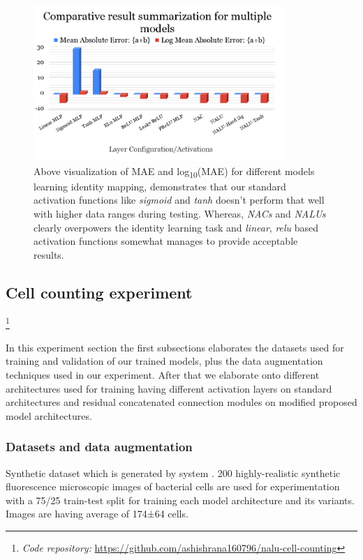 \documentclass[runningheads]{llncs}
\begin{document}
\begin{figure}[!h]
\centering
\includegraphics[width=0.85\textwidth]{summ-model-compare.png}
\caption{Above visualization of MAE and log\textsubscript{10}(MAE) for different models learning identity mapping, demonstrates that our standard activation functions like \textit{sigmoid} and \textit{tanh} doesn't perform that well with higher data ranges during testing. Whereas, \textit{NACs} and \textit{NALUs} clearly overpowers the identity learning task and \textit{linear}, \textit{relu} based activation functions somewhat manages to provide acceptable results.}
\label{fig5}
\end{figure}

\subsection{Cell counting experiment}

\footnote{\textit{Code repository:} \url{https://github.com/ashishrana160796/nalu-cell-counting}}

In this experiment section the first subsections elaborates the datasets used for training and validation of our trained models, plus the data augmentation techniques used in our experiment. After that we elaborate onto different architectures used for training having different activation layers on standard architectures and residual concatenated connection modules on modified proposed model architectures.

\subsubsection{Datasets and data augmentation}

Synthetic dataset which is generated by system \cite{b29}. 200 highly-realistic synthetic fluorescence microscopic images of bacterial cells are used for experimentation with a 75/25 train-test split for training each model architecture and its variants. Images are having average of 174±64 cells.
\end{document}
